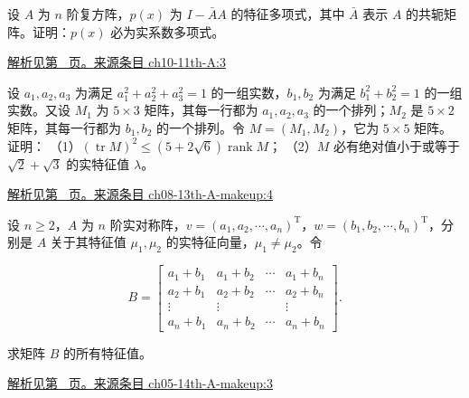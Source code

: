 \documentclass[UTF8,12pt,a4paper,fontset=fandol]{ctexart}
\begin{document}
\begin{example}\label{ex:ch10-11th-A:3}

设 $A$ 为 $n$ 阶复方阵，$p(x)$ 为 $I-\bar{A}A$ 的特征多项式，其中 $\bar{A}$ 表示 $A$ 的共轭矩阵。证明：$p(x)$ 必为实系数多项式。

\par\hyperref[ans:ch10-11th-A:3]{解析见第~\pageref{ans:ch10-11th-A:3} 页。}\quad\href{https://github.com/lzxcr/cmc-mathematics/blob/64916fa1fdbc3e444a652eca204d5669058ee321/src/problems/preliminary/11/03.md}{来源条目 ch10-11th-A:3}

\end{example}

\begin{example}\label{ex:ch08-13th-A-makeup:4}

设 $a_{1},a_{2},a_{3}$ 为满足 $a_{1}^{2}+a_{2}^{2}+a_{3}^{2}=1$ 的一组实数，$b_{1},b_{2}$ 为满足 $b_{1}^{2}+b_{2}^{2}=1$ 的一组实数。又设 $M_{1}$ 为 $5\times 3$ 矩阵，其每一行都为 $a_{1},a_{2},a_{3}$ 的一个排列；$M_{2}$ 是 $5\times 2$ 矩阵，其每一行都为 $b_{1},b_{2}$ 的一个排列。令 $M=\left(M_{1},M_{2}\right)$，它为 $5\times 5$ 矩阵。证明：
（1）$(\operatorname{tr}M)^{2}\leq(5+2\sqrt{6})\operatorname{rank}M$；
（2）$M$ 必有绝对值小于或等于 $\sqrt{2}+\sqrt{3}$ 的实特征值 $\lambda$。

\par\hyperref[ans:ch08-13th-A-makeup:4]{解析见第~\pageref{ans:ch08-13th-A-makeup:4} 页。}\quad\href{https://github.com/lzxcr/cmc-mathematics/blob/64916fa1fdbc3e444a652eca204d5669058ee321/src/problems/preliminary/13-makeup/04.md}{来源条目 ch08-13th-A-makeup:4}

\end{example}

\begin{example}\label{ex:ch05-14th-A-makeup:3}

设 $n \geq 2$，$A$ 为 $n$ 阶实对称阵，$v = \left(a_1,a_2,\cdots,a_n\right)^{\mathrm{T}}$，$w = \left(b_1,b_2,\cdots,b_n\right)^{\mathrm{T}}$，分别是 $A$ 关于其特征值 $\mu_1, \mu_2$ 的实特征向量，$\mu_1 \neq \mu_2$。令

\[
B = \begin{bmatrix}
a_1+b_1 & a_1+b_2 & \cdots & a_1+b_n \\
a_2+b_1 & a_2+b_2 & \cdots & a_2+b_n \\
\vdots & \vdots & & \vdots \\
a_n+b_1 & a_n+b_2 & \cdots & a_n+b_n
\end{bmatrix}.
\]

求矩阵 $B$ 的所有特征值。

\par\hyperref[ans:ch05-14th-A-makeup:3]{解析见第~\pageref{ans:ch05-14th-A-makeup:3} 页。}\quad\href{https://github.com/lzxcr/cmc-mathematics/blob/64916fa1fdbc3e444a652eca204d5669058ee321/src/problems/preliminary/14-makeup/03.md}{来源条目 ch05-14th-A-makeup:3}

\end{example}
\end{document}
